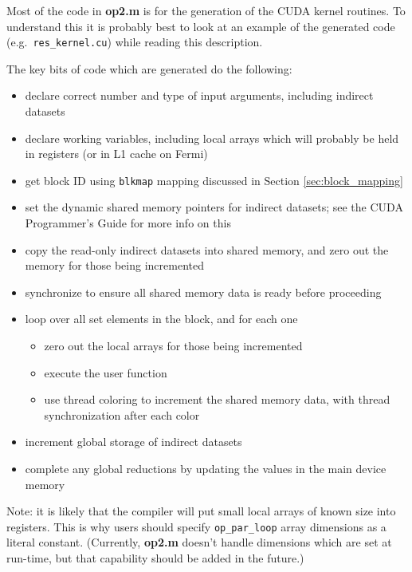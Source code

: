 \documentclass[12pt]{article}
\begin{document}
Most of the code in {\bf op2.m} is for the generation of the CUDA
kernel routines.  To understand this it is probably best to look
at an example of the generated code (e.g.~{\tt res\_kernel.cu})
while reading this description.

The key bits of code which are generated do the following:
\begin{itemize}
\item
declare correct number and type of input arguments, including
indirect datasets

\item
declare working variables, including local arrays which will probably
be held in registers (or in L1 cache on Fermi)

\item
get block ID using {\tt blkmap} mapping discussed in Section
\ref{sec:block_mapping}

\item
set the dynamic shared memory pointers for indirect datasets; see
the CUDA Programmer's Guide for more info on this

\item
copy the read-only indirect datasets into shared memory,
and zero out the memory for those being incremented

\item
synchronize to ensure all shared memory data is ready before proceeding

\item
loop over all set elements in the block, and for each one
 \begin{itemize}
 \item zero out the local arrays for those being incremented
 \item execute the user function
 \item use thread coloring to increment the shared memory data,
       with thread synchronization after each color
 \end{itemize}

\item
increment global storage of indirect datasets

\item
complete any global reductions by updating the values in the main device
memory

\end{itemize}


Note: it is likely that the compiler will put small local arrays of
known size into registers.  This is why users should specify
{\tt op\_par\_loop} array dimensions as a literal constant.
(Currently, {\bf op2.m} doesn't handle dimensions which are set at
run-time, but that capability should be added in the future.)
\end{document}
